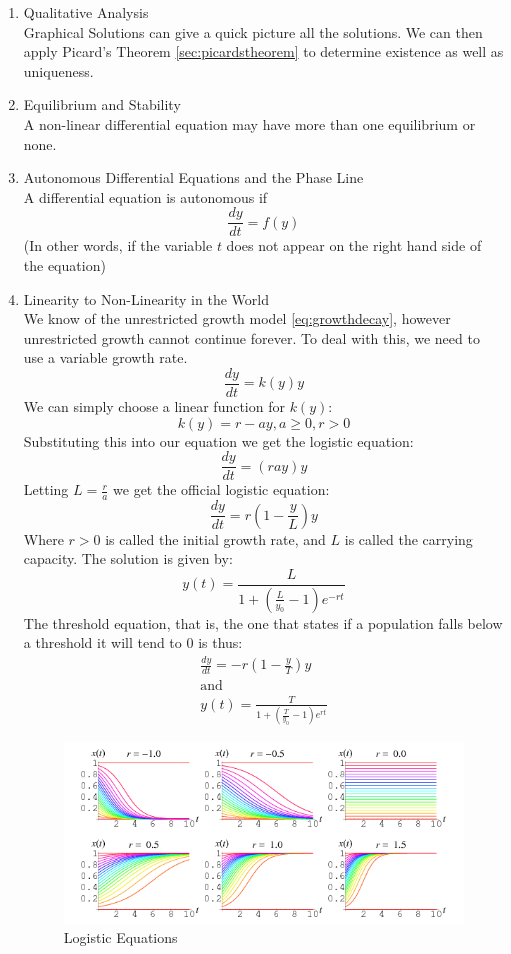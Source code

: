\begin{enumerate}
\item Qualitative Analysis\\
Graphical Solutions can give a quick picture all the solutions. We can then apply Picard's Theorem \eqref{sec:picardstheorem} to determine existence as well as uniqueness.
\item Equilibrium and Stability\\
A non-linear differential equation may have more than one equilibrium or none.
\item Autonomous Differential Equations and the Phase Line\\
A differential equation is autonomous if
    \[
    \frac{dy}{dt} = f(y)
    \]
(In other words, if the variable $t$ does not appear on the right hand side of the equation)
\item Linearity to Non-Linearity in the World\\
We know of the unrestricted growth model \eqref{eq:growthdecay}, however unrestricted growth cannot continue forever. To deal with this, we need to use a variable growth rate.
    \[
    \frac{dy}{dt} = k(y) y
    \]
We can simply choose a linear function for $k(y)$:
    \[
    k(y) = r - ay, a \ge 0, r > 0
    \]
Substituting this into our equation we get the logistic equation:
    \[
    \frac{dy}{dt} = (r ay) y
    \]
Letting $L=\frac{r}{a}$ we get the official logistic equation:
    \[
    \frac{dy}{dt} = r \left( 1 - \frac{y}{L} \right) y
    \]
Where $r > 0$ is called the initial growth rate, and $L$ is called the carrying capacity. The solution is given by:
    \[
    y(t) = \frac{L}{1 + \left( \frac{L}{y_0} - 1 \right) e^{-rt}}
    \]
The threshold equation, that is, the one that states if a population falls below a threshold it will tend to $0$ is thus:
\[
\begin{aligned}
\frac{dy}{dt} = -r \left( 1 - \frac{y}{T} \right) y\\
\text{and}\\
y(t) = \frac{T}{1 + \left( \frac{T}{y_0} - 1 \right) e^{rt}}
\end{aligned}
\]

\begin{figure}[h!]\label{fig:logeq}
    \centering
        \includegraphics[scale=0.5]{./img/LogisticEquation.png}
    \caption{Logistic Equations}
\end{figure}

\end{enumerate}

